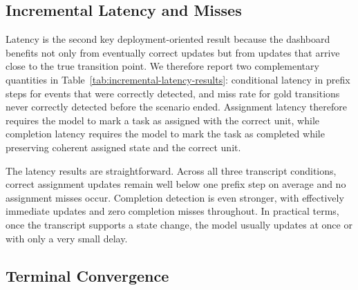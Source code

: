 \subsection{Incremental Latency and Misses}

Latency is the second key deployment-oriented result because the dashboard benefits not only from eventually correct updates but from updates that arrive close to the true transition point. We therefore report two complementary quantities in Table~\ref{tab:incremental-latency-results}: conditional latency in prefix steps for events that were correctly detected, and miss rate for gold transitions never correctly detected before the scenario ended. Assignment latency therefore requires the model to mark a task as assigned with the correct unit, while completion latency requires the model to mark the task as completed while preserving coherent assigned state and the correct unit.

The latency results are straightforward. Across all three transcript conditions, correct assignment updates remain well below one prefix step on average and no assignment misses occur. Completion detection is even stronger, with effectively immediate updates and zero completion misses throughout. In practical terms, once the transcript supports a state change, the model usually updates at once or with only a very small delay.

\begin{table}[t]
\centering
\small
{}
\caption{Incremental correct-detection latency and miss rate by transcript structure.}
\label{tab:incremental-latency-results}
\end{table}

\subsection{Terminal Convergence}

